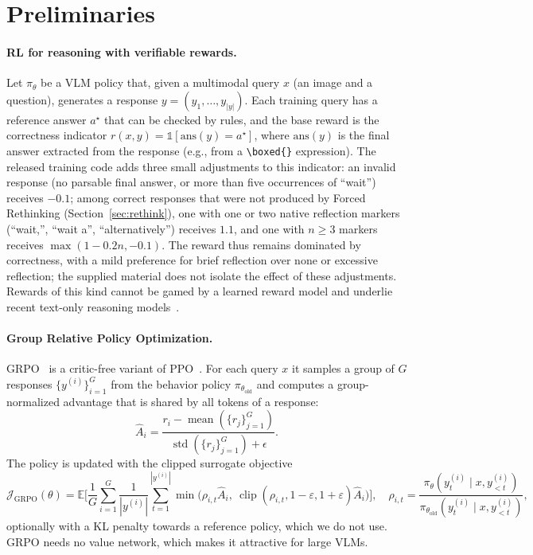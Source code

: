 \documentclass{article}
\begin{document}
\section{Preliminaries}
\label{sec:prelim}

\paragraph{RL for reasoning with verifiable rewards.}
Let $\pi_\theta$ be a VLM policy that, given a multimodal query $x$ (an image and a question), generates a response $y=(y_1,\dots,y_{|y|})$. Each training query has a reference answer $a^\star$ that can be checked by rules, and the base reward is the correctness indicator $r(x,y)=\mathbb{1}[\mathrm{ans}(y)=a^\star]$, where $\mathrm{ans}(y)$ is the final answer extracted from the response (e.g., from a \texttt{\textbackslash boxed\{\}} expression). The released training code adds three small adjustments to this indicator: an invalid response (no parsable final answer, or more than five occurrences of ``wait'') receives $-0.1$; among correct responses that were not produced by Forced Rethinking (Section~\ref{sec:rethink}), one with one or two native reflection markers (``wait,'', ``wait a'', ``alternatively'') receives $1.1$, and one with $n\geq3$ markers receives $\max(1-0.2n,-0.1)$. The reward thus remains dominated by correctness, with a mild preference for brief reflection over none or excessive reflection; the supplied material does not isolate the effect of these adjustments. Rewards of this kind cannot be gamed by a learned reward model and underlie recent text-only reasoning models~\cite{deepseek-r1,kimi-1_5,simplerl}.

\paragraph{Group Relative Policy Optimization.}
GRPO~\cite{deepseek-r1} is a critic-free variant of PPO~\cite{ppo}. For each query $x$ it samples a group of $G$ responses $\{y^{(i)}\}_{i=1}^{G}$ from the behavior policy $\pi_{\theta_\text{old}}$ and computes a group-normalized advantage that is shared by all tokens of a response:
\begin{equation}
\hat{A}_i=\frac{r_i-\operatorname{mean}(\{r_j\}_{j=1}^{G})}{\operatorname{std}(\{r_j\}_{j=1}^{G})+\epsilon}.
\label{eq:adv}
\end{equation}
The policy is updated with the clipped surrogate objective
\begin{equation}
\mathcal{J}_\text{GRPO}(\theta)=\mathbb{E}\Bigg[\frac{1}{G}\sum_{i=1}^{G}\frac{1}{|y^{(i)}|}\sum_{t=1}^{|y^{(i)}|}\min\Big(\rho_{i,t}\hat{A}_i,\ \operatorname{clip}(\rho_{i,t},1-\varepsilon,1+\varepsilon)\hat{A}_i\Big)\Bigg],\quad \rho_{i,t}=\frac{\pi_\theta(y^{(i)}_t\mid x,y^{(i)}_{<t})}{\pi_{\theta_\text{old}}(y^{(i)}_t\mid x,y^{(i)}_{<t})},
\label{eq:grpo}
\end{equation}
optionally with a KL penalty towards a reference policy, which we do not use. GRPO needs no value network, which makes it attractive for large VLMs.
\end{document}
